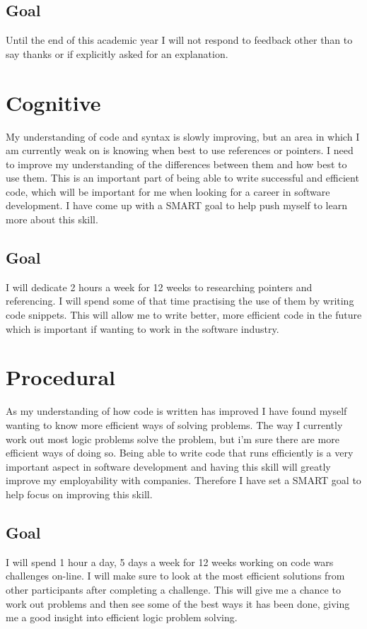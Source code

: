\documentclass{scrartcl}
\begin{document}
\subsection{Goal}
Until the end of this academic year I will not respond to feedback other than to say thanks or if explicitly asked for an explanation.

\section{Cognitive}
My understanding of code and syntax is slowly improving, but an area in which I am currently weak on is knowing when best to use references or pointers. I need to improve my understanding of the differences between them and how best to use them. This is an important part of being able to write successful and efficient code, which will be important for me when looking for a career in software development. I have come up with a SMART goal to help push myself to learn more about this skill.
\subsection{Goal}
I will dedicate 2 hours a week for 12 weeks to researching pointers and referencing. I will spend some of that time practising the use of them by writing code snippets. This will allow me to write better, more efficient code in the future which is important if wanting to work in the software industry.


\section{Procedural}
As my understanding of how code is written has improved I have found myself wanting to know more efficient ways of solving problems. The way I currently work out most logic problems solve the problem, but i'm sure there are more efficient ways of doing so. Being able to write code that runs efficiently is a very important aspect in software development and having this skill will greatly improve my employability with companies. Therefore I have set a SMART goal to help focus on improving this skill.
\subsection{Goal}
I will spend 1 hour a day, 5 days a week for 12 weeks working on code wars challenges on-line. I will make sure to look at the most efficient solutions from other participants after completing a challenge. This will give me a chance to work out problems and then see some of the best ways it has been done, giving me a good insight into efficient logic problem solving.
\end{document}
